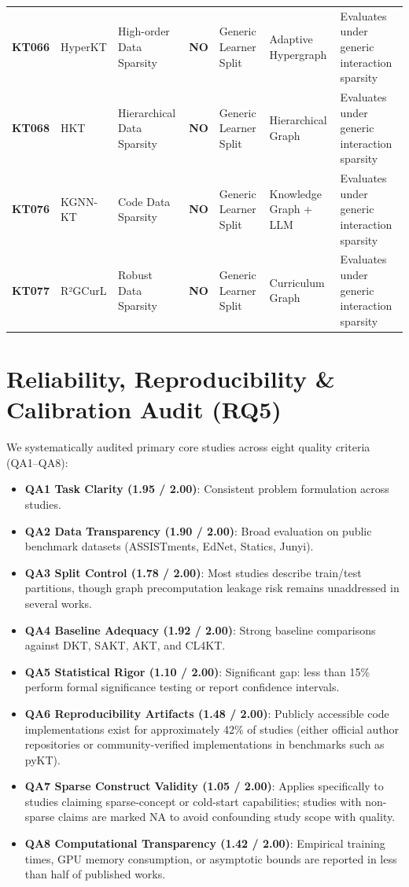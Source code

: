 \documentclass[10pt,journal,compsoc]{IEEEtran}
\begin{document}
\begin{table}[t]
{\begin{tabular}{lllllll}
\textbf{KT066} & HyperKT \cite{KT066_HyperKT_2025} & High-order Data Sparsity & \textbf{NO} & Generic Learner Split & Adaptive Hypergraph & Evaluates under generic interaction sparsity \\
\textbf{KT068} & HKT \cite{KT068_HKT_2025} & Hierarchical Data Sparsity & \textbf{NO} & Generic Learner Split & Hierarchical Graph & Evaluates under generic interaction sparsity \\
\textbf{KT076} & KGNN-KT \cite{KT076_KGNNKT_2025} & Code Data Sparsity & \textbf{NO} & Generic Learner Split & Knowledge Graph + LLM & Evaluates under generic interaction sparsity \\
\textbf{KT077} & R²GCurL \cite{KT077_R2GCurL_2026} & Robust Data Sparsity & \textbf{NO} & Generic Learner Split & Curriculum Graph & Evaluates under generic interaction sparsity \\
\bottomrule
\end{tabular}
}
\end{table}

\section{Reliability, Reproducibility \& Calibration Audit (RQ5)}

We systematically audited primary core studies across eight quality criteria (QA1--QA8):
\begin{itemize}
    \item \textbf{QA1 Task Clarity (1.95 / 2.00)}: Consistent problem formulation across studies.
    \item \textbf{QA2 Data Transparency (1.90 / 2.00)}: Broad evaluation on public benchmark datasets (ASSISTments, EdNet, Statics, Junyi).
    \item \textbf{QA3 Split Control (1.78 / 2.00)}: Most studies describe train/test partitions, though graph precomputation leakage risk remains unaddressed in several works.
    \item \textbf{QA4 Baseline Adequacy (1.92 / 2.00)}: Strong baseline comparisons against DKT, SAKT, AKT, and CL4KT.
    \item \textbf{QA5 Statistical Rigor (1.10 / 2.00)}: Significant gap: less than 15\% perform formal significance testing or report confidence intervals.
    \item \textbf{QA6 Reproducibility Artifacts (1.48 / 2.00)}: Publicly accessible code implementations exist for approximately 42\% of studies (either official author repositories or community-verified implementations in benchmarks such as pyKT).
    \item \textbf{QA7 Sparse Construct Validity (1.05 / 2.00)}: Applies specifically to studies claiming sparse-concept or cold-start capabilities; studies with non-sparse claims are marked NA to avoid confounding study scope with quality.
    \item \textbf{QA8 Computational Transparency (1.42 / 2.00)}: Empirical training times, GPU memory consumption, or asymptotic bounds are reported in less than half of published works.
\end{itemize}
\end{document}
